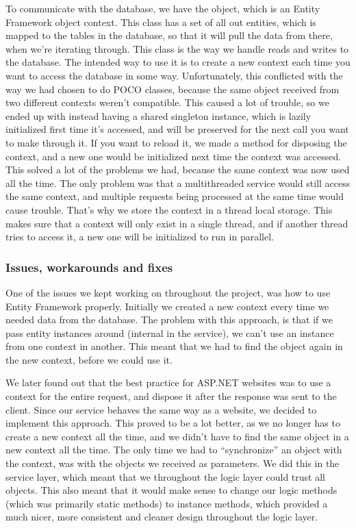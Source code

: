 To communicate with the database, we have the  object, which is an Entity Framework object context. This class has a set of all out entities, which is mapped to the tables in the database, so that it will pull the data from there, when we're iterating through. This class is the way we handle reads and writes to the database. The intended way to use it is to create a new context each time you want to access the database in some way. Unfortunately, this conflicted with the way we had chosen to do POCO classes, because the same object received from two different contexts weren't compatible. This caused a lot of trouble, so we ended up with instead having a shared singleton instance, which is lazily initialized first time it's accessed, and will be preserved for the next call you want to make through it. If you want to reload it, we made a method for disposing the context, and a new one would be initialized next time the context was accessed. This solved a lot of the problems we had, because the same context was now used all the time. The only problem was that a multithreaded service would still access the same context, and multiple requests being processed at the same time would cause trouble. That's why we store the context in a thread local storage. This makes sure that a context will only exist in a single thread, and if another thread tries to access it, a new one will be initialized to run in parallel.

\subsubsection{Issues, workarounds and fixes}
\label{Implementation_Service_Architecture_Issues}

One of the issues we kept working on throughout the project, was how to use Entity Framework properly. Initially we created a new context every time we needed data from the database. The problem with this approach, is that if we pass entity instances around (internal in the service), we can't use an instance from one context in another. This meant that we had to find the object again in the new context, before we could use it.

We later found out that the best practice for ASP.NET websites was to use a context for the entire request, and dispose it after the response was sent to the client. Since our service behaves the same way as a website, we decided to implement this approach. This proved to be a lot better, as we no longer has to create a new context all the time, and we didn't have to find the same object in a new context all the time. The only time we had to ``synchronize'' an object with the context, was with the objects we received as parameters. We did this in the service layer, which meant that we throughout the logic layer could trust all objects. This also meant that it would make sense to change our logic methods (which was primarily static methods) to instance methods, which provided a much nicer, more consistent and cleaner design throughout the logic layer.

